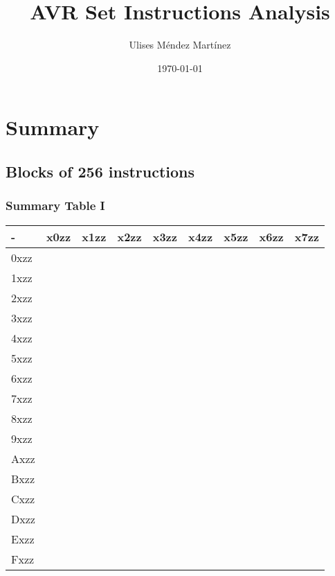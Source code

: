 \documentclass{beamer}
\title[AVR Set Instructions Analysis]{AVR Set Instructions Analysis} %
\author{Ulises M\'endez Mart\'{i}nez} %
\institute[UAG] %
{
Universidad Aut\'onoma de Guadalajara  \\ %
\medskip
\textit{ulisesmdzmtz@gmail.com} %
}
\date{\today} %
\begin{document}
\begin{frame}
\titlepage %
\end{frame}



\section{Summary} 
\subsection{Blocks of 256 instructions}
\begin{frame}
\frametitle{Summary Table I}
\small
\begin{center}
    \begin{tabular}{| l | l | l | l | l | l | l | l | l |}
    \hline
    - & x0zz & x1zz & x2zz & x3zz & x4zz & x5zz & x6zz & x7zz \\    \hline
    0xzz & & & & & & & & \\ \hline
    1xzz & & & & & & & & \\ \hline
    2xzz & & & & & & & & \\ \hline
    3xzz & & & & & & & & \\ \hline
    4xzz & & & & & & & & \\ \hline
    5xzz & & & & & & & & \\ \hline
    6xzz & & & & & & & & \\ \hline
    7xzz & & & & & & & & \\ \hline
    8xzz & & & & & & & & \\ \hline
    9xzz & & & & & & & & \\ \hline
    Axzz & & & & & & & & \\ \hline
    Bxzz & & & & & & & & \\ \hline
    Cxzz & & & & & & & & \\ \hline
    Dxzz & & & & & & & & \\ \hline
    Exzz & & & & & & & & \\ \hline
    Fxzz & & & & & & & & \\ \hline
    \end{tabular}
\end{center}
\end{frame}
\end{document}
